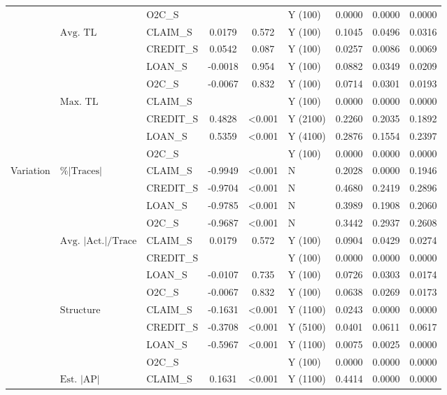 \begin{longtable}{lllcclccc}
 &  & O2C\_S &  &  & Y (100) & 0.0000 & 0.0000 & 0.0000 \\
\cmidrule(lr){2-9}
 & $\text{Avg. TL}$ & CLAIM\_S & 0.0179 & 0.572 & Y (100) & 0.1045 & 0.0496 & 0.0316 \\
 &  & CREDIT\_S & 0.0542 & 0.087 & Y (100) & 0.0257 & 0.0086 & 0.0069 \\
 &  & LOAN\_S & -0.0018 & 0.954 & Y (100) & 0.0882 & 0.0349 & 0.0209 \\
 &  & O2C\_S & -0.0067 & 0.832 & Y (100) & 0.0714 & 0.0301 & 0.0193 \\
\cmidrule(lr){2-9}
 & $\text{Max. TL}$ & CLAIM\_S &  &  & Y (100) & 0.0000 & 0.0000 & 0.0000 \\
 &  & CREDIT\_S & 0.4828 & <0.001 & Y (2100) & 0.2260 & 0.2035 & 0.1892 \\
 &  & LOAN\_S & 0.5359 & <0.001 & Y (4100) & 0.2876 & 0.1554 & 0.2397 \\
 &  & O2C\_S &  &  & Y (100) & 0.0000 & 0.0000 & 0.0000 \\
\cmidrule(lr){1-9}
Variation & $\%|\text{Traces}|$ & CLAIM\_S & -0.9949 & <0.001 & N & 0.2028 & 0.0000 & 0.1946 \\
 &  & CREDIT\_S & -0.9704 & <0.001 & N & 0.4680 & 0.2419 & 0.2896 \\
 &  & LOAN\_S & -0.9785 & <0.001 & N & 0.3989 & 0.1908 & 0.2060 \\
 &  & O2C\_S & -0.9687 & <0.001 & N & 0.3442 & 0.2937 & 0.2608 \\
\cmidrule(lr){2-9}
 & $\text{Avg.\ } | \text{Act.}| /\text{Trace}$ & CLAIM\_S & 0.0179 & 0.572 & Y (100) & 0.0904 & 0.0429 & 0.0274 \\
 &  & CREDIT\_S &  &  & Y (100) & 0.0000 & 0.0000 & 0.0000 \\
 &  & LOAN\_S & -0.0107 & 0.735 & Y (100) & 0.0726 & 0.0303 & 0.0174 \\
 &  & O2C\_S & -0.0067 & 0.832 & Y (100) & 0.0638 & 0.0269 & 0.0173 \\
\cmidrule(lr){2-9}
 & $\text{Structure}$ & CLAIM\_S & -0.1631 & <0.001 & Y (1100) & 0.0243 & 0.0000 & 0.0000 \\
 &  & CREDIT\_S & -0.3708 & <0.001 & Y (5100) & 0.0401 & 0.0611 & 0.0617 \\
 &  & LOAN\_S & -0.5967 & <0.001 & Y (1100) & 0.0075 & 0.0025 & 0.0000 \\
 &  & O2C\_S &  &  & Y (100) & 0.0000 & 0.0000 & 0.0000 \\
\cmidrule(lr){2-9}
 & $\text{Est.\ } |\text{AP}|$ & CLAIM\_S & 0.1631 & <0.001 & Y (1100) & 0.4414 & 0.0000 & 0.0000 \\

\end{longtable}
